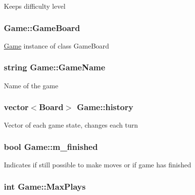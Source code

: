 Keeps difficulty level \hypertarget{class_game_aeb67bc4fc06221330cfd7c862c85b66d}{
\subsubsection[{Game\-Board}]{ Game\-::\-Game\-Board}}\label{class_game_aeb67bc4fc06221330cfd7c862c85b66d}
\hyperlink{class_game}{Game} instance of class Game\-Board \hypertarget{class_game_a1b56d5db37d900da0911378cc01f4cad}{
\subsubsection[{Game\-Name}]{\setlength{\rightskip}{0pt plus 5cm}string Game\-::\-Game\-Name\hspace{0.3cm}{\ttfamily [protected]}}}\label{class_game_a1b56d5db37d900da0911378cc01f4cad}
Name of the game \hypertarget{class_game_a7c0dd74fa2e5c366638596b7e82428f1}{
\subsubsection[{history}]{\setlength{\rightskip}{0pt plus 5cm}vector$<${\bf Board}$>$ Game\-::history\hspace{0.3cm}{\ttfamily [protected]}}}\label{class_game_a7c0dd74fa2e5c366638596b7e82428f1}
Vector of each game state, changes each turn \hypertarget{class_game_aee0b70deb19422d35b2061beb339bdf8}{
\subsubsection[{m\-\_\-finished}]{\setlength{\rightskip}{0pt plus 5cm}bool Game\-::m\-\_\-finished}}\label{class_game_aee0b70deb19422d35b2061beb339bdf8}
Indicates if still possible to make moves or if game has finished \hypertarget{class_game_a53cb9be6604469db6b3abac24c5a2ab6}{
\subsubsection[{Max\-Plays}]{\setlength{\rightskip}{0pt plus 5cm}int Game\-::\-Max\-Plays\hspace{0.3cm}{\ttfamily [protected]}}}\label{class_game_a53cb9be6604469db6b3abac24c5a2ab6}
